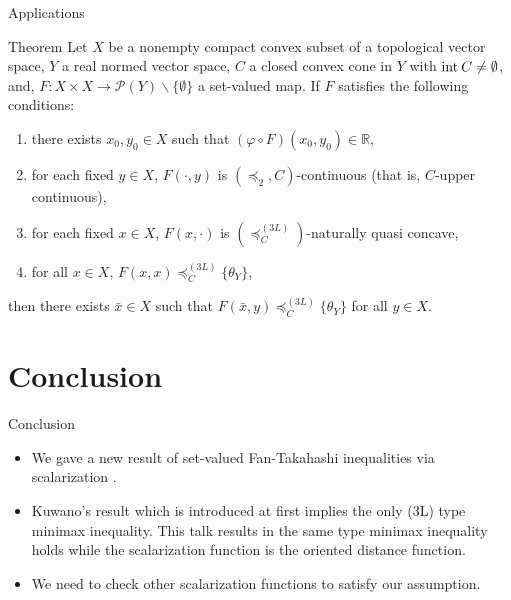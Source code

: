 \documentclass[aspectratio=169, dvipdfmx, 11pt]{beamer}
\newcommand{\RealNumberSet}{\mathbb{R}}
\newcommand{\Interior}[1]{\text{\rm int\:${#1}$}} %
\begin{document}
\begin{frame}{Applications}
  \begin{block}{Theorem}
    Let $X$ be a nonempty compact convex subset of a topological vector space,
    $Y$ a real normed vector space, $C$ a closed convex cone in $Y$ with $\Interior{C} \ne \emptyset$,
    and, $F\colon X \times X \to \mathcal{P}(Y) \backslash \{\emptyset\}$ a set-valued map.
    If $F$ satisfies the following conditions:
    \begin{enumerate}
      \item there exists $x_0, y_0 \in X$ such that $(\varphi \circ F)(x_0,y_0) \in \RealNumberSet$,
      \item for each fixed $y \in X$, $F(\cdot,y)$ is $(\preccurlyeq_{2}, C)$-continuous (that is, $C$-upper continuous),
      \item for each fixed $x \in X$, $F(x,\cdot)$ is $(\preccurlyeq_{C}^{(3L)})$-naturally quasi concave,
      \item for all $x \in X$, $F(x,x) \preccurlyeq_{C}^{(3L)} \{\theta_{Y}\}$,
    \end{enumerate}
    then there exists $\bar{x} \in X$ such that $ F(\bar{x},y) \preccurlyeq_{C}^{(3L)} \{\theta_{Y}\} $ for all $y \in X$.
  \end{block}
\end{frame}


\section{Conclusion}

\begin{frame}{Conclusion}
  \begin{itemize}
    \item We gave a new result of set-valued Fan-Takahashi inequalities via scalarization  .
    \item Kuwano's result which is introduced at first implies the only (3L) type minimax inequality.
          This talk results in the same type minimax inequality holds
          while the scalarization function is the oriented distance function.
    \item We need to check other scalarization functions to satisfy our assumption.
  \end{itemize}
\end{frame}

\begin{frame}[allowframebreaks]
  \printbibliography
\end{frame}
\end{document}
